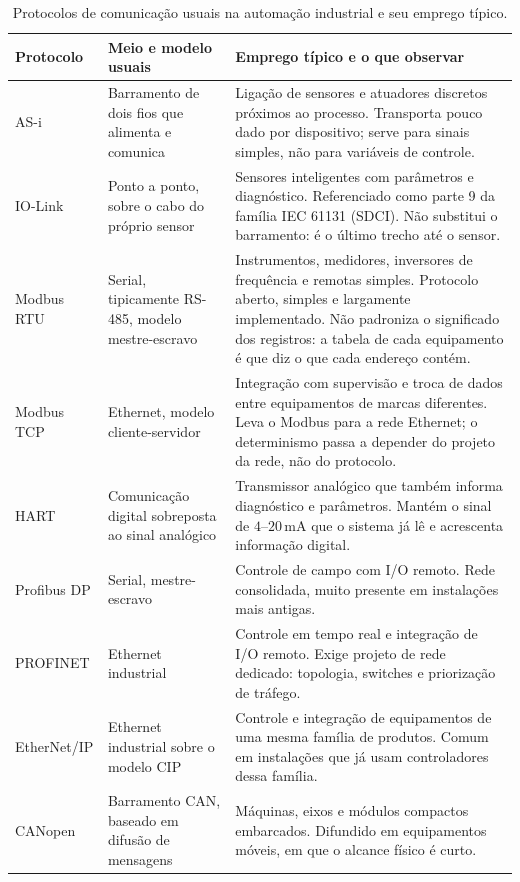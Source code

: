 \begin{table}[H]
  \centering
  \caption{Protocolos de comunicação usuais na automação industrial e seu emprego típico.}
  \label{tab:protocolos}
  \begin{tabular}{p{2.3cm} p{4.2cm} p{7.7cm}}
    \toprule
    Protocolo & Meio e modelo usuais & Emprego típico e o que observar \\
    \midrule
    AS-i
      & Barramento de dois fios que alimenta e comunica
      & Ligação de sensores e atuadores discretos próximos ao processo. Transporta pouco dado por
        dispositivo; serve para sinais simples, não para variáveis de controle. \\
    \addlinespace
    IO-Link
      & Ponto a ponto, sobre o cabo do próprio sensor
      & Sensores inteligentes com parâmetros e diagnóstico. Referenciado como parte 9 da família
        IEC 61131 (SDCI). Não substitui o barramento: é o último trecho até o sensor. \\
    \addlinespace
    Modbus RTU
      & Serial, tipicamente RS-485, modelo mestre-escravo
      & Instrumentos, medidores, inversores de frequência e remotas simples. Protocolo aberto,
        simples e largamente implementado. Não padroniza o significado dos registros: a tabela de
        cada equipamento é que diz o que cada endereço contém. \\
    \addlinespace
    Modbus TCP
      & Ethernet, modelo cliente-servidor
      & Integração com supervisão e troca de dados entre equipamentos de marcas diferentes. Leva o
        Modbus para a rede Ethernet; o determinismo passa a depender do projeto da rede, não do
        protocolo. \\
    \addlinespace
    HART
      & Comunicação digital sobreposta ao sinal analógico
      & Transmissor analógico que também informa diagnóstico e parâmetros. Mantém o sinal de
        $4$--$20\,$mA que o sistema já lê e acrescenta informação digital. \\
    \addlinespace
    Profibus DP
      & Serial, mestre-escravo
      & Controle de campo com I/O remoto. Rede consolidada, muito presente em instalações mais
        antigas. \\
    \addlinespace
    PROFINET
      & Ethernet industrial
      & Controle em tempo real e integração de I/O remoto. Exige projeto de rede dedicado:
        topologia, switches e priorização de tráfego. \\
    \addlinespace
    EtherNet/IP
      & Ethernet industrial sobre o modelo CIP
      & Controle e integração de equipamentos de uma mesma família de produtos. Comum em
        instalações que já usam controladores dessa família. \\
    \addlinespace
    CANopen
      & Barramento CAN, baseado em difusão de mensagens
      & Máquinas, eixos e módulos compactos embarcados. Difundido em equipamentos móveis, em que o
        alcance físico é curto. \\
    \bottomrule
  \end{tabular}
\end{table}


